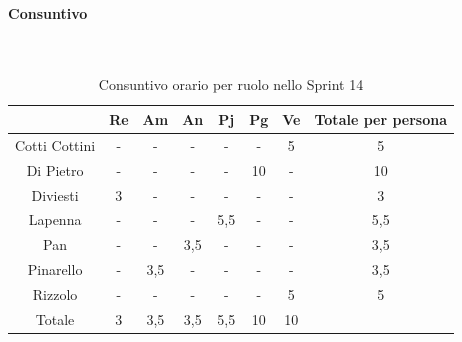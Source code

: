 \documentclass{article}
\begin{document}
                \paragraph{Consuntivo}\mbox{}\\
                \begin{table}[H]
                    \centering
                    \begin{tabular}{|c|c|c|c|c|c|c|c|}
                    \hline
                                  & Re  & Am  & An  & Pj  & Pg  & Ve  & Totale per persona \\ \hline
                    Cotti Cottini & -   & -   & -   & -   & -   & 5   & 5                  \\ \hline
                    Di Pietro     & -   & -   & -   & -   & 10  & -   & 10                 \\ \hline
                    Diviesti      & 3   & -   & -   & -   & -   & -   & 3                  \\ \hline
                    Lapenna       & -   & -   & -   & 5,5 & -   & -   & 5,5                \\ \hline
                    Pan           & -   & -   & 3,5 & -   & -   & -   & 3,5                \\ \hline
                    Pinarello     & -   & 3,5 & -   & -   & -   & -   & 3,5                \\ \hline
                    Rizzolo       & -   & -   & -   & -   & -   & 5   & 5                  \\ \hline
                    Totale        & 3   & 3,5 & 3,5 & 5,5 & 10  & 10  &                    \\ \hline
                    \end{tabular}
                    \caption{Consuntivo orario per ruolo nello Sprint 14}
                \end{table}

\end{document}
